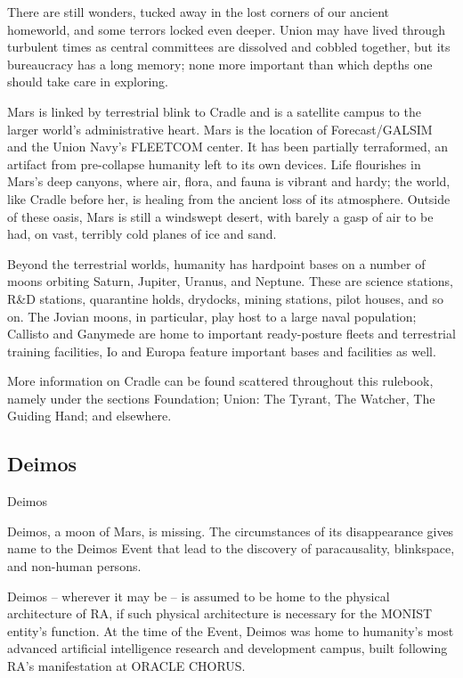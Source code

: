                                                                                                           


There are still wonders, tucked away in the lost corners of our ancient homeworld, and some  
terrors locked even deeper. Union may have lived through turbulent times as central committees  
are dissolved and cobbled together, but its bureaucracy has a long memory; none more  
important than which depths one should take care in exploring. 
 

Mars is linked by terrestrial blink to Cradle and is a satellite campus to the larger world’s  
administrative heart. Mars is the location of Forecast/GALSIM and the Union Navy’s FLEETCOM  
center. It has been partially terraformed, an artifact from pre-collapse humanity left to its own  
devices. Life flourishes in Mars’s deep canyons, where air, flora, and fauna is vibrant and hardy;  
the world, like Cradle before her, is healing from the ancient loss of its atmosphere. Outside of  
these oasis, Mars is still a windswept desert, with barely a gasp of air to be had, on vast, terribly  
cold planes of ice and sand.
 

Beyond the terrestrial worlds, humanity has hardpoint bases on a number of moons orbiting  
Saturn, Jupiter, Uranus, and Neptune. These are science stations, R\&D stations, quarantine  
holds, drydocks, mining stations, pilot houses, and so on. The Jovian moons, in particular, play  
host to a large naval population; Callisto and Ganymede are home to important ready-posture  
fleets and terrestrial training facilities, Io and Europa feature important bases and facilities as  
well.    
 

More information on Cradle can be found scattered throughout this rulebook, namely under the  
sections Foundation; Union: The Tyrant, The Watcher, The Guiding Hand; and elsewhere.    

\subsection{Deimos}
Deimos  

Deimos, a moon of Mars, is missing. The circumstances of its disappearance gives name to the  
Deimos Event that lead to the discovery of paracausality, blinkspace, and non-human persons. 
 

Deimos -- wherever it may be -- is assumed to be home to the physical architecture of RA, if  
such physical architecture is necessary for the MONIST entity’s function. At the time of the  
Event, Deimos was home to humanity’s most advanced artificial intelligence research and  
development campus, built following RA’s manifestation at ORACLE CHORUS. 
 

